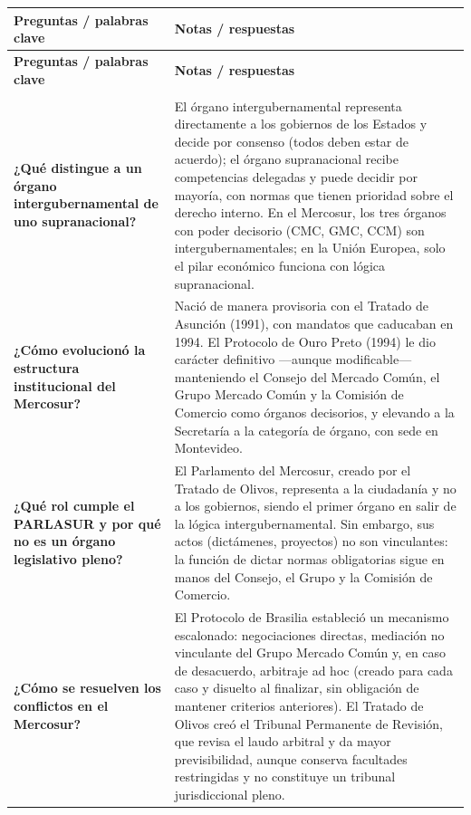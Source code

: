\documentclass[12pt,oneside]{book}
\begin{document}
\begin{longtable}{
    >{\raggedright\arraybackslash}p{}
    >{\raggedright\arraybackslash}p{}
}
\toprule
\textbf{Preguntas / palabras clave} & \textbf{Notas / respuestas} \\
\midrule
\endfirsthead

\toprule
\textbf{Preguntas / palabras clave} & \textbf{Notas / respuestas} \\
\midrule
\endhead

\midrule
\multicolumn{2}{r}{\textit{Continúa en la página siguiente}} \\
\endfoot

\bottomrule
\endlastfoot

\textbf{¿Qué distingue a un órgano intergubernamental de uno supranacional?} &
El órgano intergubernamental representa directamente a los gobiernos de los Estados y decide por consenso (todos deben estar de acuerdo); el órgano supranacional recibe competencias delegadas y puede decidir por mayoría, con normas que tienen prioridad sobre el derecho interno. En el Mercosur, los tres órganos con poder decisorio (CMC, GMC, CCM) son intergubernamentales; en la Unión Europea, solo el pilar económico funciona con lógica supranacional. \\

\textbf{¿Cómo evolucionó la estructura institucional del Mercosur?} &
Nació de manera provisoria con el Tratado de Asunción (1991), con mandatos que caducaban en 1994. El Protocolo de Ouro Preto (1994) le dio carácter definitivo —aunque modificable— manteniendo el Consejo del Mercado Común, el Grupo Mercado Común y la Comisión de Comercio como órganos decisorios, y elevando a la Secretaría a la categoría de órgano, con sede en Montevideo. \\

\textbf{¿Qué rol cumple el PARLASUR y por qué no es un órgano legislativo pleno?} &
El Parlamento del Mercosur, creado por el Tratado de Olivos, representa a la ciudadanía y no a los gobiernos, siendo el primer órgano en salir de la lógica intergubernamental. Sin embargo, sus actos (dictámenes, proyectos) no son vinculantes: la función de dictar normas obligatorias sigue en manos del Consejo, el Grupo y la Comisión de Comercio. \\

\textbf{¿Cómo se resuelven los conflictos en el Mercosur?} &
El Protocolo de Brasilia estableció un mecanismo escalonado: negociaciones directas, mediación no vinculante del Grupo Mercado Común y, en caso de desacuerdo, arbitraje ad hoc (creado para cada caso y disuelto al finalizar, sin obligación de mantener criterios anteriores). El Tratado de Olivos creó el Tribunal Permanente de Revisión, que revisa el laudo arbitral y da mayor previsibilidad, aunque conserva facultades restringidas y no constituye un tribunal jurisdiccional pleno. \\


\end{longtable}
\end{document}

